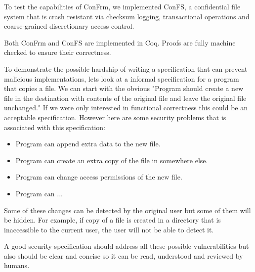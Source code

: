 To test the capabilities of ConFrm, we implemented ConFS, a confidential file system that is crash resistant via checksum logging, transactional operations and coarse-grained discretionary access control. 

Both ConFrm and ConFS are implemented in Coq. Proofs are fully machine checked to ensure their correctness.

To demonstrate the possible hardship of writing a specification that can prevent malicious implementations, lets look at a informal specification for a program that copies a file. We can start with the obvious "Program should create a new file in the destination with contents of the original file and leave the original file unchanged." If we were only interested in functional correctness this could be an acceptable specification. However here are some security problems that is associated with this specification:

\begin{itemize}
	\item Program can append extra data to the new file.
	\item Program can create an extra copy of the file in somewhere else.
	\item Program can change access permissions of the new file.
	\item Program can ...
\end{itemize}

Some of these changes can be detected by the original user but some of them will be hidden. For example, if copy of a file is created in a directory that is inaccessible to the current user, the user will not be able to detect it. 

A good security specification should address all these possible vulnerabilities but also should be clear and concise so it can be read, understood and reviewed by humans. 

